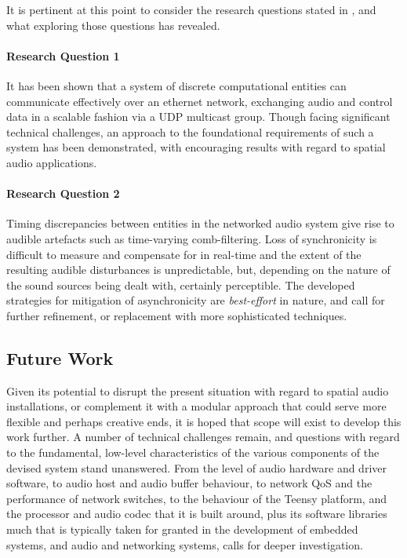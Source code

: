 It is pertinent at this point to consider the research questions stated in
, and what exploring those questions has
revealed.

\paragraph{Research Question 1}
It has been shown that a system of discrete computational entities can
communicate effectively over an ethernet network, exchanging audio and control
data in a scalable fashion via a UDP multicast group.
Though facing significant technical challenges, an approach to the foundational
requirements of such a system has been demonstrated, with encouraging results
with regard to spatial audio applications.

\paragraph{Research Question 2}
Timing discrepancies between entities in the networked audio system give rise
to audible artefacts such as time-varying comb-filtering.
Loss of synchronicity is difficult to measure and compensate for in real-time
and the extent of the resulting audible disturbances is unpredictable, but,
depending on the nature of the sound sources being dealt with,
certainly perceptible.
The developed strategies for mitigation of asynchronicity are
\textit{best-effort} in nature, and call for further refinement, or replacement
with more sophisticated techniques.

\subsection{Future Work}\label{subsec:future-work}

Given its potential to disrupt the present situation with regard to spatial
audio installations, or complement it with a modular approach that could serve
more flexible and perhaps creative ends, it is hoped that scope will exist to
develop this work further.
A number of technical challenges remain, and questions with regard to the
fundamental, low-level characteristics of the various components of the devised
system stand unanswered.
From the level of audio hardware and driver software, to audio host and audio
buffer behaviour, to network QoS and the performance of network switches, to
the behaviour of the Teensy platform, and the processor and audio codec that it
is built around, plus its software libraries \textemdash{} much that is
typically taken for granted in the development of embedded systems, and audio
and networking systems, calls for deeper investigation.

